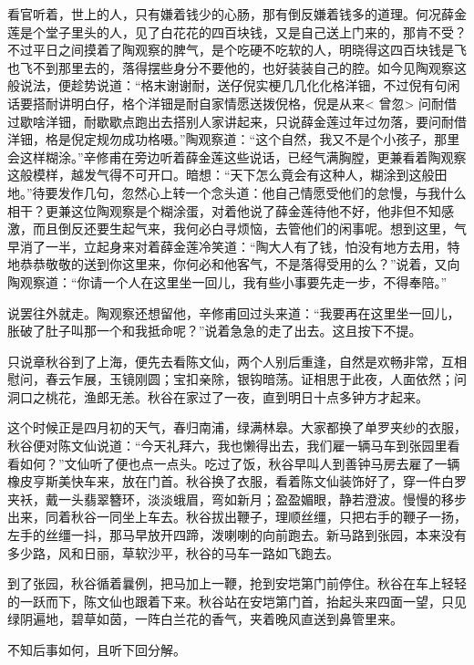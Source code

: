 \documentclass[12pt,UTF8]{ctexbook}
\begin{document}
{{{看官听着，世上的人，只有嫌着钱少的心肠，那有倒反嫌着钱多的道理。何况薛金莲是个堂子里头的人，见了白花花的四百块钱，又是自己送上门来的，那肯不受？不过平日之间摸着了陶观察的脾气，是个吃硬不吃软的人，明晓得这四百块钱是飞也飞不到那里去的，落得摆些身分不要他的，也好装装自己的腔。如今见陶观察这般说法，便趁势说道：“格末谢谢耐，送仔倪实梗几几化化格洋钿，不过倪有句闲话要搭耐讲明白仔，格个洋钿是耐自家情愿送拨倪格，倪是从来< 曾忽> 问耐借过歇啥洋钿，耐歇歇点跑出去搭别人家讲起来，只说薛金莲过年过勿落，要问耐借洋钿，格是倪定规勿成功格嗫。”陶观察道：“这个自然，我又不是个小孩子，那里会这样糊涂。”辛修甫在旁边听着薛金莲这些说话，已经气满胸膛，更兼看着陶观察这般模样，越发气得不可开口。暗想：“天下怎么竟会有这种人，糊涂到这般田地。”待要发作几句，忽然心上转一个念头道：他自己情愿受他们的怠慢，与我什么相干？更兼这位陶观察是个糊涂蛋，对着他说了薛金莲待他不好，他非但不知感激，而且倒反还要生起气来，我何必白寻烦恼，去管他们的闲事呢。想到这里，气早消了一半，立起身来对着薛金莲冷笑道：“陶大人有了钱，怕没有地方去用，特地恭恭敬敬的送到你这里来，你何必和他客气，不是落得受用的么？”说着，又向陶观察道：“你请一个人在这里坐一回儿，我有些小事要先走一步，不得奉陪。”

说罢往外就走。陶观察还想留他，辛修甫回过头来道：“我要再在这里坐一回儿，胀破了肚子叫那一个和我抵命呢？”说着急急的走了出去。这且按下不提。

只说章秋谷到了上海，便先去看陈文仙，两个人别后重逢，自然是欢畅非常，互相慰问，春云乍展，玉镜刚圆；宝扣亲除，银钩暗荡。证相思于此夜，人面依然；问洞口之桃花，渔郎无恙。秋谷在家过了一夜，直到明日十点多钟方才起来。

这个时候正是四月初的天气，春归南浦，绿满林皋。大家都换了单罗夹纱的衣服，秋谷便对陈文仙说道：“今天礼拜六，我也懒得出去，我们雇一辆马车到张园里看看如何？”文仙听了便也点一点头。吃过了饭，秋谷早叫人到善钟马房去雇了一辆橡皮亨斯美快车来，放在门首。秋谷换了衣服，看着陈文仙装饰好了，穿一件白罗夹袄，戴一头翡翠簪环，淡淡蛾眉，弯如新月；盈盈媚眼，静若澄波。慢慢的移步出来，同着秋谷一同坐上车去。秋谷拔出鞭子，理顺丝缰，只把右手的鞭子一扬，左手的丝缰一抖，那马早放开四蹄，泼喇喇的向前跑去。新马路到张园，本来没有多少路，风和日丽，草软沙平，秋谷的马车一路如飞跑去。

到了张园，秋谷循着曩例，把马加上一鞭，抢到安垲第门前停住。秋谷在车上轻轻的一跃而下，陈文仙也跟着下来。秋谷站在安垲第门首，抬起头来四面一望，只见绿阴遍地，碧草如茵，一阵白兰花的香气，夹着晚风直送到鼻管里来。

不知后事如何，且听下回分解。





}}}
\end{document}
